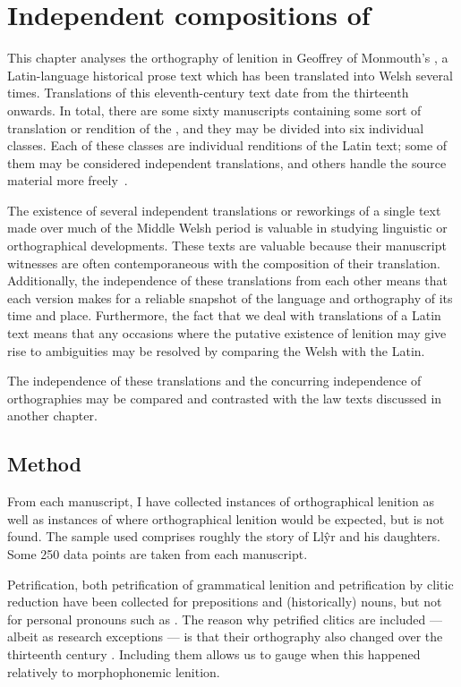 \chapter{Independent compositions of }
This chapter analyses the orthography of lenition in Geoffrey of Monmouth's , a Latin-language historical prose text which has been translated into Welsh several times.
Translations of this eleventh-century text date from the thirteenth onwards.
In total, there are some sixty manuscripts containing some sort of translation or rendition of the , and they may be divided into six individual classes.
Each of these classes are individual renditions of the Latin text; some of them may be considered independent translations, and others handle the source material more freely~\autocite[xxiv-xxxi]{roberts_brut_1971}.

The existence of several independent translations or reworkings of a single text made over much of the Middle Welsh period is valuable in studying linguistic or orthographical developments.
These texts are valuable because their manuscript witnesses are often contemporaneous with the composition of their translation. Additionally, the independence of these translations from each other means that each version makes for a reliable snapshot of the language and orthography of its time and place.
Furthermore, the fact that we deal with translations of a Latin text means that any occasions where the putative existence of lenition may give rise to ambiguities may be resolved by comparing the Welsh with the Latin. 

The independence of these translations and the concurring independence of orthographies may be compared and contrasted with the law texts discussed in another chapter.



\section{Method}
\label{sec:method}
From each manuscript, I have collected instances of orthographical
lenition as well as instances of where orthographical lenition would
be expected, but is not found. The sample used comprises roughly the
story of Ll\^yr and his daughters.  Some 250 data points are taken
from each manuscript.

Petrification, both petrification of grammatical lenition and
petrification by clitic reduction have been collected for prepositions
and (historically) nouns, but not for personal pronouns such
as . The reason why petrified clitics are included --- albeit
as research exceptions --- is that their orthography also changed over the
thirteenth century . Including them allows
us to gauge when this happened relatively to morphophonemic lenition.

